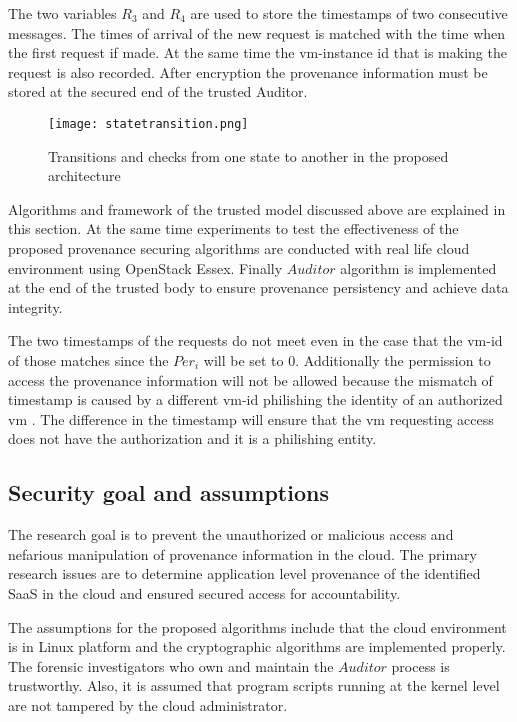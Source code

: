 \documentclass[conference]{IEEEtran}
\begin{document}
The two variables $R_3$ and $R_4$ are used to store the timestamps of two consecutive messages. The times of arrival of the new request is matched with the time when the first request if made. At the same time the vm-instance id that is making the request is also recorded. After encryption the provenance information must be stored at the secured end of the trusted Auditor.
\begin{figure*}[t!]
\centering
\texttt{[image: statetransition.png]}
\caption{Transitions and checks from one state to another in the proposed architecture}
\label{figure4}
\end{figure*}

Algorithms and framework of the trusted model discussed above are explained in this section. At the same time experiments to test the effectiveness of the proposed provenance securing algorithms are conducted with real life cloud environment using OpenStack Essex. Finally $Auditor$ algorithm is implemented at the end of the trusted body to ensure provenance persistency and achieve data integrity.

The two timestamps of the requests do not meet even in the case that the vm-id of those matches since the $Per_i$ will be set to 0. Additionally the permission to access the provenance information will not be allowed because the mismatch of timestamp is caused by a different vm-id philishing the identity of an authorized vm \cite{asif2013cloudniagara}. The difference in the timestamp will ensure that the vm requesting access does not have the authorization and it is a philishing entity.

\subsection{Security goal and assumptions}

The research goal is to prevent the unauthorized or malicious access and nefarious manipulation of provenance information in the cloud. The primary research issues are to determine application level provenance of the identified SaaS in the cloud and ensured secured access for accountability.



The assumptions for the proposed algorithms include that the cloud environment is in Linux platform and the cryptographic algorithms are implemented properly. The forensic investigators who own and maintain the $Auditor$ process is trustworthy. Also, it is assumed that program scripts running at the kernel level are not tampered by the cloud administrator.
\end{document}
